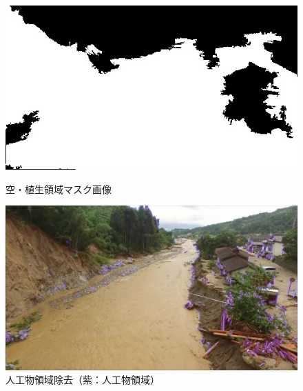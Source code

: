 \documentclass[a4paper, twocolumn, xelatex, 10pt, ja=standard, Ligatures=TeX]{bxjsarticle}
\begin{document}
		\begin{figure}[t]
			\begin{minipage}{0.48\hsize}
				\centering
				\includegraphics[width=\linewidth]{img/maskNature.jpg}
				\caption{空・植生領域マスク画像}
				\label{img05}
			\end{minipage}
			\begin{minipage}{0.48\hsize}
				\centering
				\includegraphics[width=\linewidth]{img/artifact.jpg}
				\caption{人工物領域除去（紫：人工物領域）}
				\label{img06}
			\end{minipage}
		\end{figure}
\end{document}
